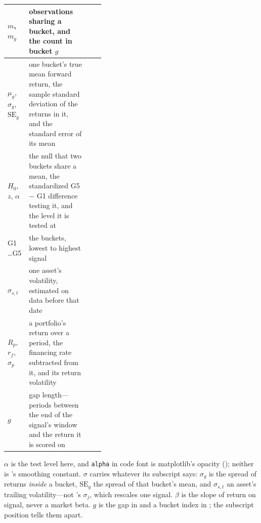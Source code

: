 \begin{xltabular}{\linewidth}{|>{\raggedright\arraybackslash}p{0.22\linewidth}|X|>{\raggedright\arraybackslash}p{0.16\linewidth}|}
$m$, $m_g$
  & observations sharing a bucket, and the count in bucket $g$
  &  \\ \hline
$\mu_g$, $\sigma_g$, $\mathrm{SE}_g$
  & one bucket's true mean forward return, the sample standard deviation of the returns in it, and
    the standard error of its mean
  &  \\ \hline
$H_0$, $z$, $\alpha$
  & the null that two buckets share a mean, the standardized G5 $-$ G1 difference testing it, and
    the level it is tested at
  &  \\ \hline
G1 \ldots G5
  & the buckets, lowest to highest signal
  &  \\ \hline
$\sigma_{s,t}$
  & one asset's volatility, estimated on data before that date
  &  \\ \hline
$R_p$, $r_f$, $\sigma_p$
  & a portfolio's return over a period, the financing rate subtracted from it, and its return
    volatility
  &  \\ \hline
$g$
  & gap length---periods between the end of the signal's window and the return it is scored on
  &  \\ \hline
\end{xltabular}

\begin{note}
$\alpha$ is the test level here, and \texttt{alpha} in code font is matplotlib's opacity
(); neither is 's smoothing constant.
$\sigma$ carries whatever its subscript says: $\sigma_g$ is the spread of returns \emph{inside} a
bucket, $\mathrm{SE}_g$ the spread of that bucket's mean, and $\sigma_{s,t}$ an asset's trailing
volatility---not 's $\sigma_j$, which rescales one signal.
$\beta$ is the slope of return on signal, never a market beta. $g$ is the gap in
 and a bucket index in ; the subscript position
tells them apart.
\end{note}
